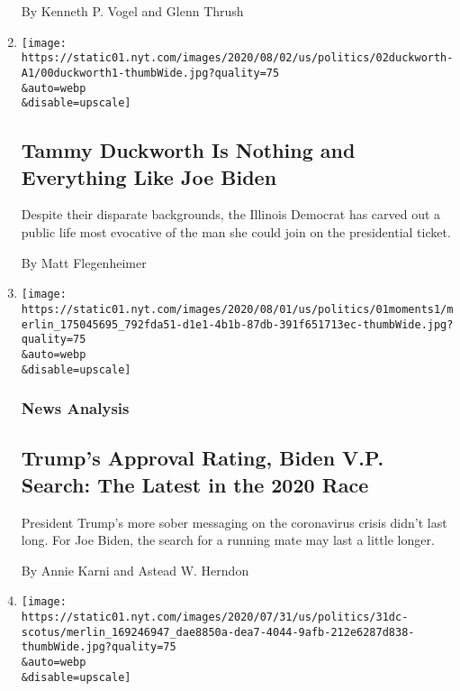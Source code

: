 \begin{enumerate}
  By Kenneth P. Vogel and Glenn Thrush
\item
  \href{/2020/08/01/us/politics/tammy-duckworth-biden-vp.html}{}

  \texttt{[image: https://static01.nyt.com/images/2020/08/02/us/politics/02duckworth-A1/00duckworth1-thumbWide.jpg?quality=75\\\&auto=webp\\\&disable=upscale]}

  \hypertarget{tammy-duckworth-is-nothing-and-everything-like-joe-biden}{%
  \subsection{Tammy Duckworth Is Nothing and Everything Like Joe
  Biden}\label{tammy-duckworth-is-nothing-and-everything-like-joe-biden}}

  Despite their disparate backgrounds, the Illinois Democrat has carved
  out a public life most evocative of the man she could join on the
  presidential ticket.

  By Matt Flegenheimer
\item
  \href{/2020/08/01/us/politics/trump-biden-polls-vp.html}{}

  \texttt{[image: https://static01.nyt.com/images/2020/08/01/us/politics/01moments1/merlin\_175045695\_792fda51-d1e1-4b1b-87db-391f651713ec-thumbWide.jpg?quality=75\\\&auto=webp\\\&disable=upscale]}

  \hypertarget{news-analysis}{%
  \subsubsection{News Analysis}\label{news-analysis}}

  \hypertarget{trumps-approval-rating-biden-vp-search-the-latest-in-the-2020-race}{%
  \subsection{Trump's Approval Rating, Biden V.P. Search: The Latest in
  the 2020
  Race}\label{trumps-approval-rating-biden-vp-search-the-latest-in-the-2020-race}}

  President Trump's more sober messaging on the coronavirus crisis
  didn't last long. For Joe Biden, the search for a running mate may
  last a little longer.

  By Annie Karni and Astead W. Herndon
\item
  \href{/2020/07/31/us/supreme-court-trump-border-wall.html}{}

  \texttt{[image: https://static01.nyt.com/images/2020/07/31/us/politics/31dc-scotus/merlin\_169246947\_dae8850a-dea7-4044-9afb-212e6287d838-thumbWide.jpg?quality=75\\\&auto=webp\\\&disable=upscale]}


\end{enumerate}
